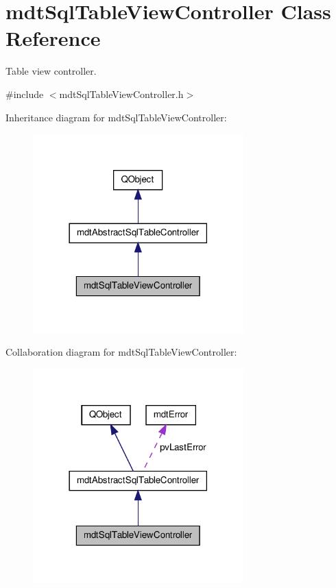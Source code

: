 \hypertarget{classmdt_sql_table_view_controller}{\section{mdt\-Sql\-Table\-View\-Controller Class Reference}
\label{classmdt_sql_table_view_controller}
}


Table view controller.  




{\ttfamily \#include $<$mdt\-Sql\-Table\-View\-Controller.\-h$>$}



Inheritance diagram for mdt\-Sql\-Table\-View\-Controller\-:
\nopagebreak
\begin{figure}[H]
\begin{center}
\leavevmode
\includegraphics[width=230pt]{classmdt_sql_table_view_controller__inherit__graph}
\end{center}
\end{figure}


Collaboration diagram for mdt\-Sql\-Table\-View\-Controller\-:
\nopagebreak
\begin{figure}[H]
\begin{center}
\leavevmode
\includegraphics[width=230pt]{classmdt_sql_table_view_controller__coll__graph}
\end{center}
\end{figure}
